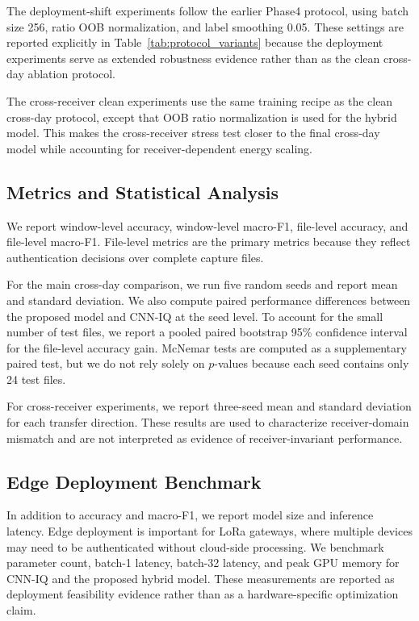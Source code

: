The deployment-shift experiments follow the earlier Phase4 protocol, using batch size 256, ratio OOB normalization, and label smoothing 0.05. These settings are reported explicitly in Table~\ref{tab:protocol_variants} because the deployment experiments serve as extended robustness evidence rather than as the clean cross-day ablation protocol.

The cross-receiver clean experiments use the same training recipe as the clean cross-day protocol, except that OOB ratio normalization is used for the hybrid model. This makes the cross-receiver stress test closer to the final cross-day model while accounting for receiver-dependent energy scaling.

\subsection{Metrics and Statistical Analysis}

We report window-level accuracy, window-level macro-F1, file-level accuracy, and file-level macro-F1. File-level metrics are the primary metrics because they reflect authentication decisions over complete capture files.

For the main cross-day comparison, we run five random seeds and report mean and standard deviation. We also compute paired performance differences between the proposed model and CNN-IQ at the seed level. To account for the small number of test files, we report a pooled paired bootstrap 95\% confidence interval for the file-level accuracy gain. McNemar tests are computed as a supplementary paired test, but we do not rely solely on $p$-values because each seed contains only 24 test files.

For cross-receiver experiments, we report three-seed mean and standard deviation for each transfer direction. These results are used to characterize receiver-domain mismatch and are not interpreted as evidence of receiver-invariant performance.

\subsection{Edge Deployment Benchmark}

In addition to accuracy and macro-F1, we report model size and inference latency. Edge deployment is important for LoRa gateways, where multiple devices may need to be authenticated without cloud-side processing. We benchmark parameter count, batch-1 latency, batch-32 latency, and peak GPU memory for CNN-IQ and the proposed hybrid model. These measurements are reported as deployment feasibility evidence rather than as a hardware-specific optimization claim.
